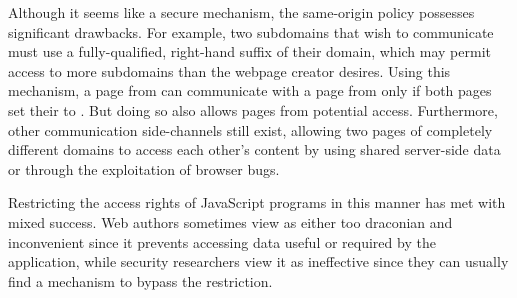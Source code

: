 \begin{table}[ht]
\centering
{}
\caption{Results of comparison to \url{http://store.company.com/dir/page.html} using the same origin policy~\cite{sop}.}
\label{tab:same-origin}
\end{table}

Although it seems like a secure mechanism, the same-origin policy possesses significant drawbacks.
For example, two subdomains that wish to communicate must use a fully-qualified, right-hand suffix of their domain, which may permit access to more subdomains than the webpage creator desires.
Using this mechanism, a page from  can communicate with a page from  only if both pages set their  to .
But doing so also allows pages from  potential access.
Furthermore, other communication side-channels still exist, allowing two pages of completely different domains to access each other's content by using shared server-side data or through the exploitation of browser bugs.

Restricting the access rights of JavaScript programs in this manner has met with mixed success.
Web authors sometimes view as either too draconian and inconvenient since it prevents accessing data useful or required by the application, while security researchers view it as ineffective since they can usually find a mechanism to bypass the restriction.


